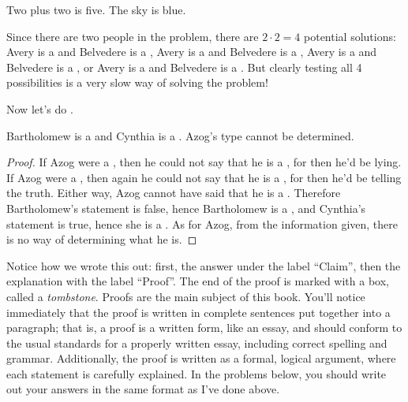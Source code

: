 \documentclass{tufte-book}
\begin{document}
\begin{dialogue}
   Two plus two is five.
   The sky is blue.
\end{dialogue}

Since there are two people in the problem, there are $2 \cdot 2 = 4$ potential solutions:   Avery is a \knight and Belvedere is a \knight, Avery is a \knight and Belvedere is a \knave, Avery is a \knave and Belvedere is a \knight, or Avery is a \knave and Belvedere is a \knave. But clearly testing all 4 possibilities is a very slow way of solving the problem! 

Now let's do .
\begin{claim}
  Bartholomew is a \knave and Cynthia is a \knight. Azog's type cannot be determined.
\end{claim}

\begin{proof}
  If Azog were a \knight, then he could not say that he is a \knave, for then he'd be lying. If Azog were a \knave, then again he could not say that he is a \knave, for then he'd be telling the truth. Either way, Azog cannot have said that he is a \knave. Therefore Bartholomew's statement is false,  hence Bartholomew is a \knave, and Cynthia's statement is true, hence she is a \knight. As for Azog, from the information given, there is no way of determining what he is.
\end{proof}


Notice how we wrote this out: first, the answer under the label ``Claim'', then the explanation with the label ``Proof''. The end of the proof is marked with a box, called a \emph{tombstone}. Proofs are the main subject of this book. You'll notice immediately that the proof is written in complete sentences put together into a paragraph; that is, a proof is a written form, like an essay, and should conform to the usual standards for a properly written essay, including correct spelling and grammar. Additionally, the proof is written as a formal, logical argument, where each statement is carefully explained. In the problems below, you should write out your answers in the same format as I've done above.
\end{document}
